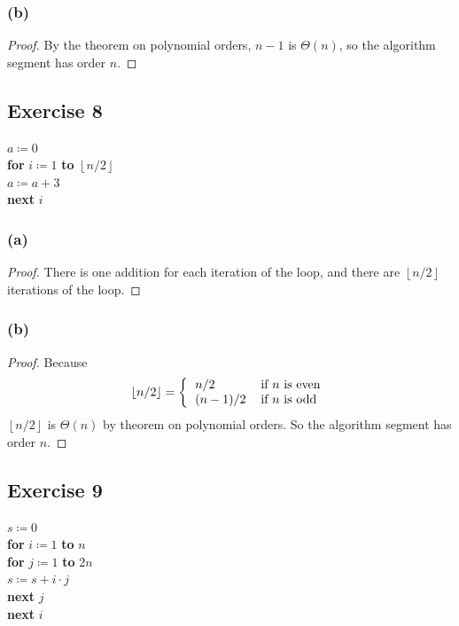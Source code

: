 \documentclass[14pt]{extarticle}
\newcommand{\floor}[1]{{\left\lfloor#1\right\rfloor}}
\begin{document}
\subsubsection{(b)}
\begin{proof}
By the theorem on polynomial orders, \(n - 1\) is \(\Theta(n)\), so the algorithm segment has order \(n\).
\end{proof}

\subsection{Exercise 8}
\begin{tabbing}
\(a \coloneqq 0\) \\
{\bf for} \= \(i \coloneqq 1\) {\bf to} \(\floor{n/2}\) \\
          \> \(a \coloneqq a + 3\) \\
{\bf next} \(i\)
\end{tabbing}

\subsubsection{(a)}
\begin{proof}
There is one addition for each iteration of the loop, and there are \(\floor{n/2}\) iterations of the loop.
\end{proof}

\subsubsection{(b)}
\begin{proof}
Because
\[
\floor{n/2} =
\left\{
\begin{tabular}{ll}
\(n/2\) & if \(n\) is even \\
\((n-1)/2\) & if \(n\) is odd
\end{tabular}
\right.
\]
\(\floor{n/2}\) is \(\Theta(n)\) by theorem on polynomial orders. So the algorithm segment has order \(n\).
\end{proof}

\subsection{Exercise 9}
\begin{tabbing}
\(s \coloneqq 0\) \\
{\bf for} \= \(i \coloneqq 1\) {\bf to} \(n\) \\
          \> {\bf for} \= \(j \coloneqq 1\) {\bf to} \(2n\) \\
          \>           \> \(s \coloneqq s + i \cdot j\) \\
          \> {\bf next} \(j\) \\
{\bf next} \(i\)
\end{tabbing}
\end{document}
